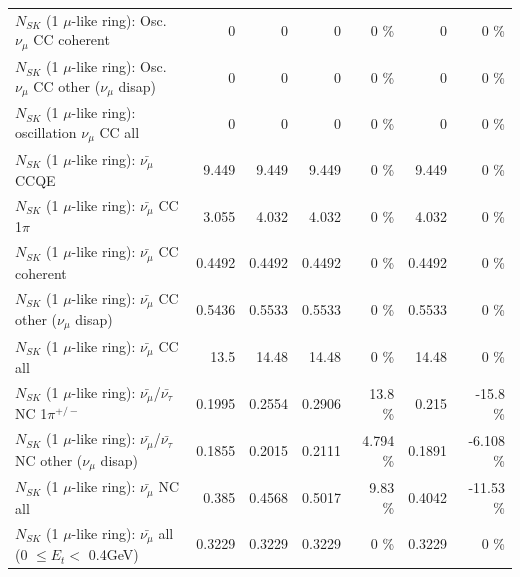 \begin{table}
\begin{tabular}{| l | r | r | r  r | r  r |}
                        $N_{SK}$ (1 $\mu$-like ring): Osc. $\nu_\mu$ CC coherent &               0 &               0 &               0 &        0 \%  &               0 &        0 \%  \\ 
         $N_{SK}$ (1 $\mu$-like ring): Osc. $\nu_\mu$ CC other ($\nu_\mu$ disap) &               0 &               0 &               0 &        0 \%  &               0 &        0 \%  \\ 
                      $N_{SK}$ (1 $\mu$-like ring): oscillation $\nu_\mu$ CC all &               0 &               0 &               0 &        0 \%  &               0 &        0 \%  \\ 
\hline
\hline
                              $N_{SK}$ (1 $\mu$-like ring): $\bar{\nu_\mu}$ CCQE &           9.449 &           9.449 &           9.449 &        0 \%  &           9.449 &        0 \%  \\ 
                         $N_{SK}$ (1 $\mu$-like ring): $\bar{\nu_\mu}$ CC 1$\pi$ &           3.055 &           4.032 &           4.032 &        0 \%  &           4.032 &        0 \%  \\ 
                       $N_{SK}$ (1 $\mu$-like ring): $\bar{\nu_\mu}$ CC coherent &          0.4492 &          0.4492 &          0.4492 &        0 \%  &          0.4492 &        0 \%  \\ 
        $N_{SK}$ (1 $\mu$-like ring): $\bar{\nu_\mu}$ CC other ($\nu_\mu$ disap) &          0.5436 &          0.5533 &          0.5533 &        0 \%  &          0.5533 &        0 \%  \\ 
                          $N_{SK}$ (1 $\mu$-like ring): $\bar{\nu_{\mu}}$ CC all &            13.5 &           14.48 &           14.48 &        0 \%  &           14.48 &        0 \%  \\ 
\hline
  $N_{SK}$ (1 $\mu$-like ring): $\bar{\nu_\mu}$/$\bar{\nu_\tau}$ NC 1$\pi^{+/-}$ &          0.1995 &          0.2554 &          0.2906 &     13.8 \%  &           0.215 &    -15.8 \%  \\ 
$N_{SK}$ (1 $\mu$-like ring): $\bar{\nu_\mu}$/$\bar{\nu_\tau}$ NC other ($\nu_\mu$ disap) &          0.1855 &          0.2015 &          0.2111 &    4.794 \%  &          0.1891 &   -6.108 \%  \\ 
                          $N_{SK}$ (1 $\mu$-like ring): $\bar{\nu_{\mu}}$ NC all &           0.385 &          0.4568 &          0.5017 &     9.83 \%  &          0.4042 &   -11.53 \%  \\ 
\hline
   $N_{SK}$ (1 $\mu$-like ring): $\bar{\nu_{\mu}}$ all (0 $\leq E_{t} <$ 0.4GeV) &          0.3229 &          0.3229 &          0.3229 &        0 \%  &          0.3229 &        0 \%  \\ 

\end{tabular}
\end{table}
